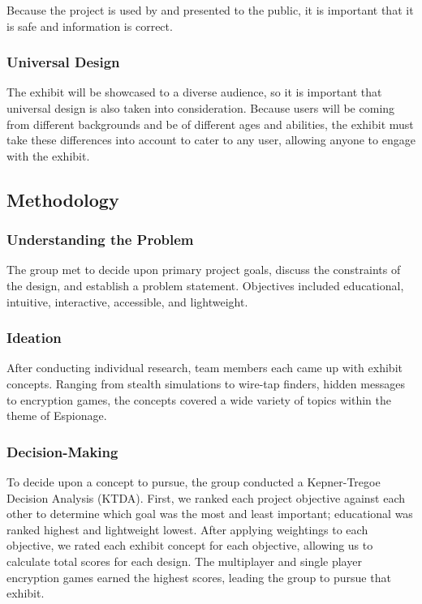 \documentclass[conference]{IEEEtran}
\begin{document}
\par Because the project is used by and presented to the public, it is important that it is safe and information is correct.  

\subsubsection{Universal Design}

\par The exhibit will be showcased to a diverse audience, so it is important that universal design is also taken into consideration.  Because users will be coming from different backgrounds and be of different ages and abilities, the exhibit must take these differences into account to cater to any user, allowing anyone to engage with the exhibit.

\subsection{Methodology}

\subsubsection{Understanding the Problem}

\par The group met to decide upon primary project goals, discuss the constraints of the design, and establish a problem statement.  Objectives included educational, intuitive, interactive, accessible, and lightweight.

\subsubsection{Ideation}

\par After conducting individual research, team members each came up with exhibit concepts.  Ranging from stealth simulations to wire-tap finders, hidden messages to encryption games, the concepts covered a wide variety of topics within the theme of Espionage. 

\subsubsection{Decision-Making}

\par To decide upon a concept to pursue, the group conducted a Kepner-Tregoe Decision Analysis (KTDA).  First, we ranked each project objective against each other to determine which goal was the most and least important; educational was ranked highest and lightweight lowest.  After applying weightings to each objective, we rated each exhibit concept for each objective, allowing us to calculate total scores for each design.  The multiplayer and single player encryption games earned the highest scores, leading the group to pursue that exhibit. 
\end{document}
